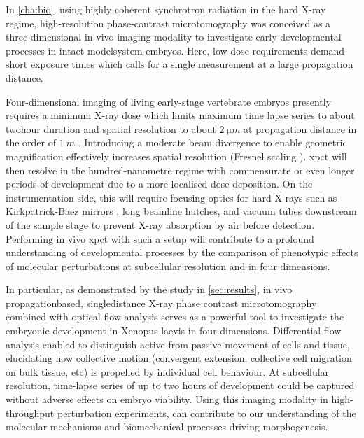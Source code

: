 \documentclass[
twoside,
openright,
titlepage,
numbers=noenddot,
headinclude,
fleqn,
a4paper,
footinclude=true,
cleardoublepage=empty,
abstractoff,
BCOR=5mm,
paper=a4,
fontsize=11pt,
british,ngerman,american,
]{scrreprt}
\begin{document}
In \cref{cha:bio}, using highly coherent synchrotron radiation in the
hard X-ray regime, high-resolution phase-contrast microtomography was
conceived as a three-dimensional in vivo imaging modality to
investigate early developmental processes in intact model\hyph system
embryos.  Here, low-dose requirements demand short exposure times
which calls for a single measurement at a large propagation distance.

Four-dimensional imaging of living early-stage vertebrate embryos
presently requires a minimum X-ray dose which limits maximum time\hyph
lapse series to about two\hyph hour duration and spatial resolution to
about $\SI{2}{\micro m}$ at propagation distance in the order of
$\SI{1}{m}$ \cite{Moosmann2013nature,Moosmann2014natp}.  Introducing a
moderate beam divergence to enable geometric magnification effectively
increases spatial resolution (Fresnel scaling \cite{PaganinBook}).
\acl{xpct} will then resolve in the hundred-nanometre regime with
commensurate or even longer periods of development due to a more
localised dose deposition.  On the instrumentation side, this will
require focusing optics for hard X-rays such as Kirkpatrick-Baez
mirrors \cite{Requena2009}, long beamline hutches, and vacuum tubes
downstream of the sample stage to prevent X-ray absorption by air
before detection.  Performing in vivo \acl{xpct} with such a setup
will contribute to a profound understanding of \eg{} developmental
processes by the comparison of phenotypic effects of molecular
perturbations at subcellular resolution and in four dimensions.

In particular, as demonstrated by the study in \cref{sec:results}, in
vivo propagation\hyph based, single\hyph distance X-ray phase\hyph
contrast microtomography combined with optical flow analysis serves as
a powerful tool to investigate the embryonic development in Xenopus
laevis in four dimensions.  Differential flow analysis enabled to
distinguish active from passive movement of cells and tissue,
elucidating how collective motion (convergent extension, collective
cell migration on bulk tissue, etc) is propelled by individual cell
behaviour.  At subcellular resolution, time-lapse series of up to two
hours of development could be captured without adverse effects on
embryo viability.  Using this imaging modality in high-throughput
perturbation experiments, can contribute to our understanding of the
molecular mechanisms and biomechanical processes driving
morphogenesis.


\end{document}
